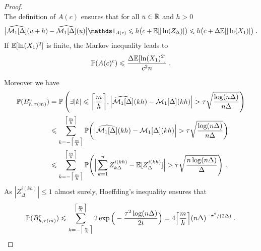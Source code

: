 \begin{proof}
\begin{subequations}
    \end{subequations}
The definition of $A(c)$ ensures that for all $u \in \mathbb{R}$ and $h > 0$
    \begin{equation}
        \big| \hat{\Mcal_1[\Delta]}(u + h) - \hat{\Mcal_1[\Delta]}(u) \big| \ind{A(c)}
        \leq
        h \big( c + \EE[|\ln(Z_{\Delta})| \big)
        \leq 
        h \big( c + \Delta \EE[|\ln(X_1)| \big)
        \eqfinp
    \label{eq:duval_5.1mellin}
 \end{equation}
If $\mathbb{E}[\ln(X_1)^2]$ is finite, the Markov inequality leads to 
    \begin{equation}
        \mathbb{P}(A(c)^c) \leqslant \frac{\Delta \mathbb{E}[\ln(X_1)^2]}{c^2 n}
        \; .
    \label{controlAc}
    \end{equation}

    Moreover we have
    \begin{align*}
        \mathbb{P}(B_{h, \tau(m)}^c) 
        &=  \mathbb{P} \left( \exists |k| \leqslant \bigg\lceil \frac{m}{h} \bigg\rceil, \Big|\widehat{\mathcal{M}_1[\Delta]}(k h) - \mathcal{M}_1[\Delta](k h) \Big| > \tau \sqrt{\frac{\log(n \Delta)}{n \Delta}} \right) \\
        &\leqslant \sum_{k = - \big\lceil \frac{m}{h} \big\rceil}^{\big\lceil \frac{m}{h} \big\rceil} \mathbb{P} \bigg( \Big|\widehat{\mathcal{M}_1[\Delta]}(k h) - \mathcal{M}_1[\Delta](k h) \Big| > \tau \sqrt{\frac{\log(n \Delta)}{n \Delta}}  \bigg)  \\
        &\leqslant 
            \sum_{k = - \big\lceil \frac{m}{h} \big\rceil}^{\big\lceil \frac{m}{h} \big\rceil} \mathbb{P} \Bigg(
           \Big|  \sum_{k = 1}^{n} Z_{k\Delta}^{i(kh)} - \mathbb{E}[Z_{\Delta}^{i(kh)}]  \Big| >  \tau \sqrt{\frac{n \log(n \Delta)}{\Delta}}  \Bigg) 
           \; .
    \end{align*}
    As $| Z_{\Delta}^{i(kh)}| \leq 1$ almost surely, Hoeffding's inequality ensures that 
    \begin{align*}
        \mathbb{P}(B_{h, \tau(m)}^c)     
        \leqslant \sum_{k = - \big\lceil \frac{m}{h} \big\rceil}^{\big\lceil \frac{m}{h} \big\rceil} 2 \exp \Big( - \frac{\tau^2\log(n \Delta)}{2 t}\Big) = 4 \Big\lceil \frac{m}{h} \Big\rceil (n \Delta)^{-\tau^2 / (2 \Delta)}
        \; .
    \end{align*}


\end{proof}
